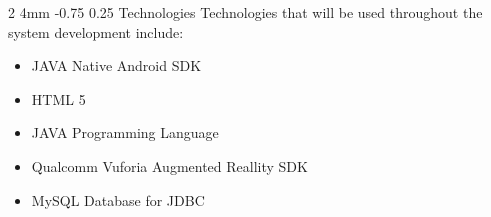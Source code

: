 \documentclass[12pt]{article}
\makeatletter
\renewcommand{\section}{\@startsection
   {section}%
   {1}%
   {0mm}%
   {-1.5\baselineskip}%
   {0.5\baselineskip}%
   {\sffamily\bfseries\upshape\normalsize}}%
\renewcommand{\subsection}{\@startsection
   {subsection}%
   {2}%
   {4mm}%
   {-0.75\baselineskip}%
   {0.25\baselineskip}%
   {\rmfamily\normalfont\scshape\normalsize}}%
\makeatother
\begin{document}
					\subsection{Technologies}
							Technologies that will be used throughout the system development include:
							\begin{itemize}
								\item JAVA Native Android SDK
								\item HTML 5
								\item JAVA Programming Language
								\item Qualcomm Vuforia Augmented Reallity SDK
								\item MySQL Database for JDBC
							\end{itemize}
                    
             
\end{document}
